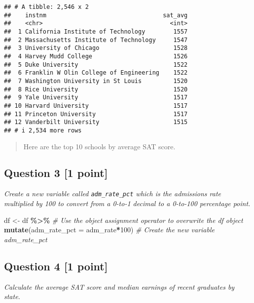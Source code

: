 \documentclass[
]{article}
\newenvironment{Shaded}{\begin{snugshade}}{\end{snugshade}}
\newcommand{\AttributeTok}[1]{\textcolor[rgb]{0.13,0.29,0.53}{#1}}
\newcommand{\CommentTok}[1]{\textcolor[rgb]{0.56,0.35,0.01}{\textit{#1}}}
\newcommand{\DecValTok}[1]{\textcolor[rgb]{0.00,0.00,0.81}{#1}}
\newcommand{\FunctionTok}[1]{\textcolor[rgb]{0.13,0.29,0.53}{\textbf{#1}}}
\newcommand{\NormalTok}[1]{#1}
\newcommand{\OtherTok}[1]{\textcolor[rgb]{0.56,0.35,0.01}{#1}}
\newcommand{\SpecialCharTok}[1]{\textcolor[rgb]{0.81,0.36,0.00}{\textbf{#1}}}
\begin{document}
\begin{verbatim}
## # A tibble: 2,546 x 2
##    instnm                                 sat_avg
##    <chr>                                    <int>
##  1 California Institute of Technology        1557
##  2 Massachusetts Institute of Technology     1547
##  3 University of Chicago                     1528
##  4 Harvey Mudd College                       1526
##  5 Duke University                           1522
##  6 Franklin W Olin College of Engineering    1522
##  7 Washington University in St Louis         1520
##  8 Rice University                           1520
##  9 Yale University                           1517
## 10 Harvard University                        1517
## 11 Princeton University                      1517
## 12 Vanderbilt University                     1515
## # i 2,534 more rows
\end{verbatim}

\begin{quote}
Here are the top 10 schools by average SAT score.
\end{quote}

\subsection{Question 3 {[}1 point{]}}\label{question-3-1-point}

\emph{Create a new variable called \texttt{adm\_rate\_pct} which is the
admissions rate multiplied by 100 to convert from a 0-to-1 decimal to a
0-to-100 percentage point.}

\begin{Shaded}
\begin{Highlighting}[]
\NormalTok{df }\OtherTok{\textless{}{-}}\NormalTok{ df }\SpecialCharTok{\%\textgreater{}\%} \CommentTok{\# Use the object assignment operator to overwrite the df object}
  \FunctionTok{mutate}\NormalTok{(}\AttributeTok{adm\_rate\_pct =}\NormalTok{ adm\_rate}\SpecialCharTok{*}\DecValTok{100}\NormalTok{) }\CommentTok{\# Create the new variable adm\_rate\_pct}
\end{Highlighting}
\end{Shaded}

\subsection{Question 4 {[}1 point{]}}\label{question-4-1-point}

\emph{Calculate the average SAT score and median earnings of recent
graduates by state.}
\end{document}
